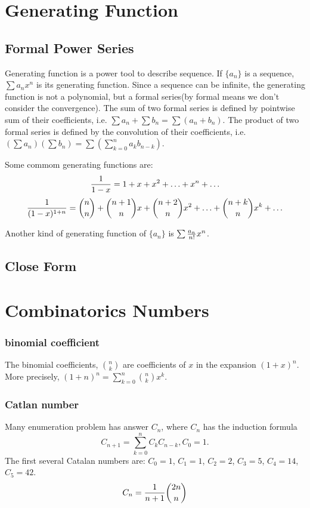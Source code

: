 \section{Generating Function}
\subsection{Formal Power Series}
Generating function is a power tool to describe sequence. If $\{a_n\}$ is a sequence,
$\sum a_n x^n$ is its generating function. Since a sequence can be infinite, the generating 
function is not a polynomial, but a formal series(by formal means we don't consider the convergence). 
The sum of two formal series is defined by pointwise sum of their coefficients, 
i.e. $\sum a_n + \sum b_n = \sum (a_n+b_n)$.
The product of two formal series is defined by the convolution of their coefficients, 
i.e. $(\sum a_n)(\sum b_n) = \sum (\sum_{k=0}^{n} a_k b_{n-k})$.

Some commom generating functions are:
$${1\over{1-x}} = 1 + x + x^2 + \ldots + x^n + \ldots$$
$${1\over{(1-x)^{1+n}}} = {n\choose n} + {n+1\choose n}x + {n+2\choose n}x^2 + \ldots + {n + k\choose n}x^k + \ldots$$

Another kind of generating function of $\{a_n\}$ is $\sum {a_n\over n!} x^n$.

\subsection{Close Form}


\section{Combinatorics Numbers}
\subsubsection{binomial coefficient}
The binomial coefficients, $n\choose k$ are coefficients of $x$ in the expansion $(1+x)^n$.
More precisely, $(1+n)^n=\sum_{k=0}^n {n\choose k}x^k$.

\subsubsection{Catlan number}
Many enumeration problem has answer $C_n$,
where $C_n$ has the induction formula
$$C_{n+1} = \sum_{k=0}^n C_k C_{n-k}, C_0=1.$$
The first several Catalan numbers are:
$C_0=1$, $C_1=1$, $C_2=2$, $C_3=5$, $C_4=14$, $C_5=42$.
$$C_n={1 \over {n + 1}} {2n \choose n}$$

